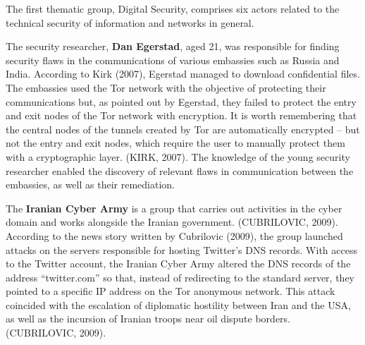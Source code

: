 The first thematic group, Digital Security, comprises six actors related to the technical security of information and networks in general.

The security researcher, \textbf{Dan Egerstad}, aged 21, was responsible for finding security flaws in the communications of various embassies such as Russia and India. According to Kirk (2007), Egerstad managed to download confidential files. The embassies used the Tor network with the objective of protecting their communications but, as pointed out by Egerstad, they failed to protect the entry and exit nodes of the Tor network with encryption. It is worth remembering that the central nodes of the tunnels created by Tor are automatically encrypted -- but not the entry and exit nodes, which require the user to manually protect them with a cryptographic layer. (KIRK, 2007). The knowledge of the young security researcher enabled the discovery of relevant flaws in communication between the embassies, as well as their remediation.

The \textbf{Iranian Cyber Army} is a group that carries out activities in the cyber domain and works alongside the Iranian government. (CUBRILOVIC, 2009). According to the news story written by Cubrilovic (2009), the group launched attacks on the servers responsible for hosting Twitter's DNS records. With access to the Twitter account, the Iranian Cyber Army altered the DNS records of the address ``twitter.com'' so that, instead of redirecting to the standard server, they pointed to a specific IP address on the Tor anonymous network. This attack coincided with the escalation of diplomatic hostility between Iran and the USA, as well as the incursion of Iranian troops near oil dispute borders. (CUBRILOVIC, 2009).

